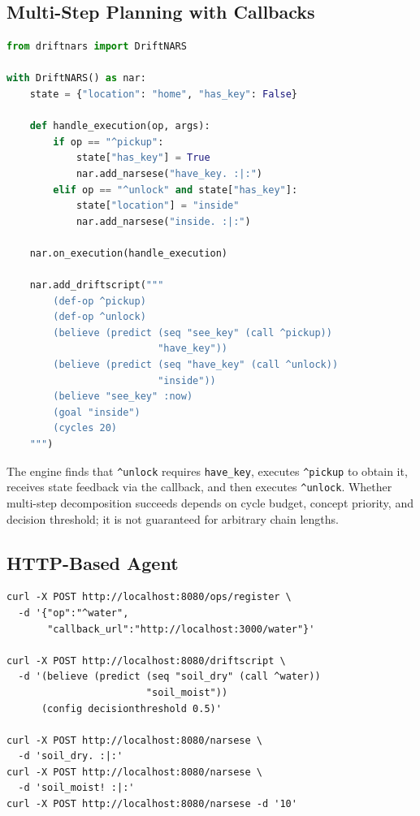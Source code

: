 \documentclass[11pt,a4paper]{article}
\begin{document}
\subsection{Multi-Step Planning with Callbacks}

\begin{lstlisting}[language=Python]
from driftnars import DriftNARS

with DriftNARS() as nar:
    state = {"location": "home", "has_key": False}

    def handle_execution(op, args):
        if op == "^pickup":
            state["has_key"] = True
            nar.add_narsese("have_key. :|:")
        elif op == "^unlock" and state["has_key"]:
            state["location"] = "inside"
            nar.add_narsese("inside. :|:")

    nar.on_execution(handle_execution)

    nar.add_driftscript("""
        (def-op ^pickup)
        (def-op ^unlock)
        (believe (predict (seq "see_key" (call ^pickup))
                          "have_key"))
        (believe (predict (seq "have_key" (call ^unlock))
                          "inside"))
        (believe "see_key" :now)
        (goal "inside")
        (cycles 20)
    """)
\end{lstlisting}

The engine finds that \texttt{\^{}unlock} requires \texttt{have\_key},
executes \texttt{\^{}pickup} to obtain it, receives state feedback via the
callback, and then executes \texttt{\^{}unlock}. Whether multi-step
decomposition succeeds depends on cycle budget, concept priority, and
decision threshold; it is not guaranteed for arbitrary chain lengths.

\subsection{HTTP-Based Agent}

\begin{lstlisting}[language={}]
curl -X POST http://localhost:8080/ops/register \
  -d '{"op":"^water",
       "callback_url":"http://localhost:3000/water"}'

curl -X POST http://localhost:8080/driftscript \
  -d '(believe (predict (seq "soil_dry" (call ^water))
                        "soil_moist"))
      (config decisionthreshold 0.5)'

curl -X POST http://localhost:8080/narsese \
  -d 'soil_dry. :|:'
curl -X POST http://localhost:8080/narsese \
  -d 'soil_moist! :|:'
curl -X POST http://localhost:8080/narsese -d '10'
\end{lstlisting}
\end{document}

